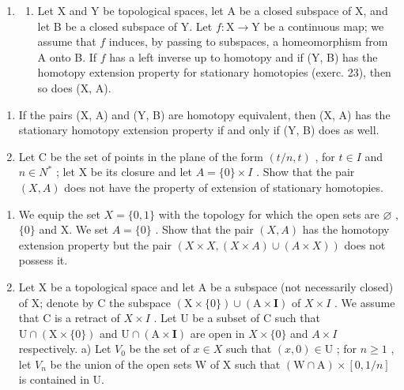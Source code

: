 \begin{enumerate}
\def\labelenumi{\arabic{enumi})}
\setcounter{enumi}{24}
\tightlist
\item
  \begin{enumerate}
  \def\labelenumii{\alph{enumii})}
  \tightlist
  \item
    Let X and Y be topological spaces, let A be a closed subspace of X, and let B be a closed subspace of Y. Let \(f \colon \mathrm{X} \to \mathrm{Y}\) be a continuous map; we assume that \(f\) induces, by passing to subspaces, a homeomorphism from A onto B. If \(f\) has a left inverse up to homotopy and if (Y, B) has the homotopy extension property for stationary homotopies (exerc. 23), then so does (X, A).
  \end{enumerate}
\end{enumerate}

\begin{enumerate}
\def\labelenumi{\alph{enumi})}
\setcounter{enumi}{1}
\item
  If the pairs (X, A) and (Y, B) are homotopy equivalent, then (X, A) has the stationary homotopy extension property if and only if (Y, B) does as well.
\item
  Let C be the set of points in the plane of the form \((t/n,t)\) , for \(t \in I\) and \(n \in N^{*}\) ; let X be its closure and let \(A = \{0\} \times I\) . Show that the pair \((X,A)\) does not have the property of extension of stationary homotopies.
\end{enumerate}

\begin{enumerate}
\def\labelenumi{\arabic{enumi})}
\setcounter{enumi}{25}
\item
  We equip the set \(X = \{0,1\}\) with the topology for which the open sets are \(\varnothing\) , \(\{0\}\) and X. We set \(A = \{0\}\) . Show that the pair \((X,A)\) has the homotopy extension property but the pair \((X \times X,(X \times A) \cup (A \times X))\) does not possess it.
\item
  Let X be a topological space and let A be a subspace (not necessarily closed) of X; denote by C the subspace \((\mathrm{X} \times \{0\}) \cup (\mathrm{A} \times \mathbf{I})\) of \(X \times I\) . We assume that C is a retract of \(X \times I\) . Let U be a subset of C such that \(\mathrm{U} \cap (\mathrm{X} \times \{0\})\) and \(\mathrm{U} \cap (\mathrm{A} \times \mathbf{I})\) are open in \(X \times \{0\}\) and \(A \times I\) respectively. a) Let \(V_{0}\) be the set of \(x \in X\) such that \((x, 0) \in \mathrm{U}\) ; for \(n \geqslant 1\) , let \(V_{n}\) be the union of the open sets W of X such that \((\mathrm{W} \cap \mathrm{A}) \times [0, 1/n]\) is contained in U.
\end{enumerate}

